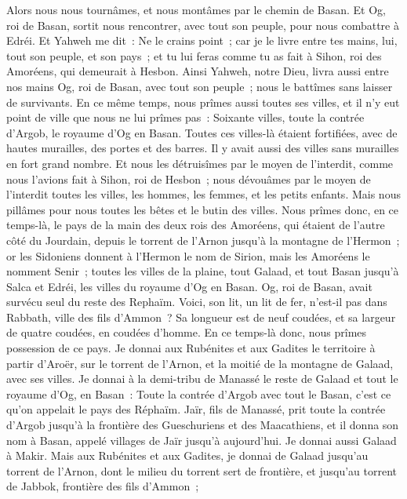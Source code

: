 \begin{multicols}{2}
\VerseOne{}Alors nous nous tournâmes, et nous montâmes par le chemin de Basan. Et Og, roi de Basan, sortit nous rencontrer, avec tout son peuple, pour nous combattre à Edréi.
Et Yahweh me dit~: Ne le crains point~; car je le livre entre tes mains, lui, tout son peuple, et son pays~; et tu lui feras comme tu as fait à Sihon, roi des Amoréens, qui demeurait à Hesbon.
Ainsi Yahweh, notre Dieu, livra aussi entre nos mains Og, roi de Basan, avec tout son peuple~; nous le battîmes sans laisser de survivants.
En ce même temps, nous prîmes aussi toutes ses villes, et il n'y eut point de ville que nous ne lui prîmes pas~: Soixante villes, toute la contrée d'Argob, le royaume d'Og en Basan.
Toutes ces villes-là étaient fortifiées, avec de hautes murailles, des portes et des barres. Il y avait aussi des villes sans murailles en fort grand nombre.
Et nous les détruisîmes par le moyen de l'interdit, comme nous l'avions fait à Sihon, roi de Hesbon~; nous dévouâmes par le moyen de l'interdit toutes les villes, les hommes, les femmes, et les petits enfants.
Mais nous pillâmes pour nous toutes les bêtes et le butin des villes.
Nous prîmes donc, en ce temps-là, le pays de la main des deux rois des Amoréens, qui étaient de l'autre côté du Jourdain, depuis le torrent de l'Arnon jusqu'à la montagne de l'Hermon~;
or les Sidoniens donnent à l'Hermon le nom de Sirion, mais les Amoréens le nomment Senir~;
toutes les villes de la plaine, tout Galaad, et tout Basan jusqu'à Salca et Edréi, les villes du royaume d'Og en Basan.
Og, roi de Basan, avait survécu seul du reste des Rephaïm. Voici, son lit, un lit de fer, n'est-il pas dans Rabbath, ville des fils d'Ammon~? Sa longueur est de neuf coudées, et sa largeur de quatre coudées, en coudées d'homme.
En ce temps-là donc, nous prîmes possession de ce pays. Je donnai aux Rubénites et aux Gadites le territoire à partir d'Aroër, sur le torrent de l'Arnon, et la moitié de la montagne de Galaad, avec ses villes.
Je donnai à la demi-tribu de Manassé le reste de Galaad et tout le royaume d'Og, en Basan~: Toute la contrée d'Argob avec tout le Basan, c'est ce qu'on appelait le pays des Réphaïm.
Jaïr, fils de Manassé, prit toute la contrée d'Argob jusqu'à la frontière des Gueschuriens et des Maacathiens, et il donna son nom à Basan, appelé villages de Jaïr jusqu'à aujourd'hui.
Je donnai aussi Galaad à Makir.
Mais aux Rubénites et aux Gadites, je donnai de Galaad jusqu'au torrent de l'Arnon, dont le milieu du torrent sert de frontière, et jusqu'au torrent de Jabbok, frontière des fils d'Ammon~;

\end{multicols}
